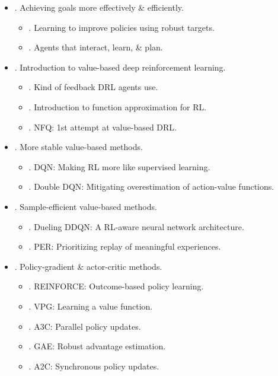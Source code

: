 \documentclass{article}
\begin{document}
\begin{itemize}
\begin{itemize}
    \end{itemize}
    \item {. Achieving goals more effectively \& efficiently.}
    \begin{itemize}
        \item {. Learning to improve policies using robust targets.}
        \item {. Agents that interact, learn, \& plan.}
    \end{itemize}
    \item {. Introduction to value-based deep reinforcement learning.}
    \begin{itemize}
        \item {. Kind of feedback DRL agents use.}
        \item {. Introduction to function approximation for RL.}
        \item {. NFQ: 1st attempt at value-based DRL.}
    \end{itemize}
    \item {. More stable value-based methods.}
    \begin{itemize}
        \item {. DQN: Making RL more like supervised learning.}
        \item {. Double DQN: Mitigating overestimation of action-value functions.}
    \end{itemize}
    \item {. Sample-efficient value-based methods.}
    \begin{itemize}
        \item {. Dueling DDQN: A RL-aware neural network architecture.}
        \item {. PER: Prioritizing replay of meaningful experiences.}
    \end{itemize}
    \item {. Policy-gradient \& actor-critic methods.}
    \begin{itemize}
        \item {. REINFORCE: Outcome-based policy learning.}
        \item {. VPG: Learning a value function.}
        \item {. A3C: Parallel policy updates.}
        \item {. GAE: Robust advantage estimation.}
        \item {. A2C: Synchronous policy updates.}
    \end{itemize}

\end{itemize}
\end{document}
